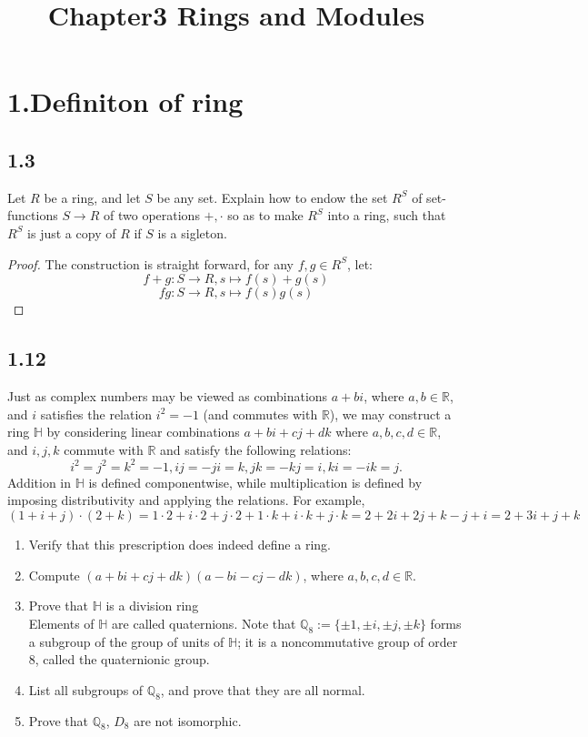 \documentclass[a4paper, pdf, 12pt]{article}
\title{Chapter3 Rings and Modules}
\begin{document}
\section*{1.Definiton of ring}
\subsection*{1.3} 
Let $R$ be a ring, and let $S$ be any set. Explain how to endow the set $R^{S}$ of
set-functions $S \rightarrow R$ of two operations $+, ·$ so as to make $R^{S}$ into a ring, such that
$R^{S}$ is just a copy of $R$ if $S$ is a sigleton.
\begin{proof}
  The construction is straight forward, for any $f, g\in R^{S}$, let:
  $$
  f+g: S\rightarrow R, s\mapsto f(s) + g(s)
  $$
  $$
  fg: S\rightarrow R, s\mapsto f(s)g(s)
  $$
\end{proof}

\subsection*{1.12}
Just as complex numbers may be viewed as combinations $a + bi$, where $a, b \in \mathbb{R}$, and $i$ satisﬁes the relation 
$i^2 = −1$ (and commutes with $\mathbb{R}$), we may construct a ring $\mathbb{H}$ by considering linear 
combinations $a + bi + cj + dk$ where $a, b, c, d \in \mathbb{R}$, and $i, j, k$ commute with $\mathbb{R}$ and 
satisfy the following relations:
$$
i^2 = j^2 = k^2 = -1 , ij = -ji = k , jk = -kj = i , ki = -ik = j .
$$
\noindent
Addition in $\mathbb{H}$ is deﬁned componentwise, while multiplication is deﬁned by imposing distributivity 
and applying the relations. For example,
$$
(1+i+j)·(2+k) = 1·2+i·2+j·2+1·k+i·k+j·k = 2+2i+2j+k−j+i = 2+3i+j+k
$$
\noindent
\begin{enumerate}[leftmargin=0cm,itemindent=.2cm,labelwidth=\itemindent,labelsep=0.2cm,align=right,label=(\roman*)]
  \item Verify that this prescription does indeed deﬁne a ring.
  \item Compute $(a + bi + cj + dk)(a-bi-cj-dk)$, where $a, b, c, d \in \mathbb{R}$.
  \item Prove that $\mathbb{H}$ is a division ring\\
  Elements of $\mathbb{H}$ are called quaternions. Note that $\mathbb{Q}_8 := \{ \pm1, \pm i, \pm j, \pm k \}$ forms a subgroup of the group 
  of units of $\mathbb{H}$; it is a noncommutative group of order 8, called the quaternionic group.
  \item List all subgroups of $\mathbb{Q}_8$, and prove that they are all normal.
  \item Prove that $\mathbb{Q}_8$, $D_8$ are not isomorphic.
\end{enumerate}
\end{document}
